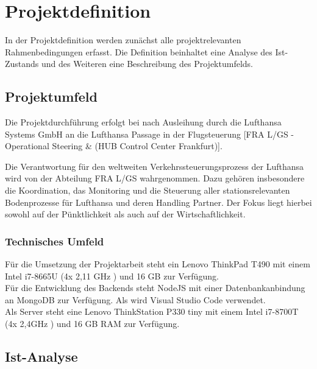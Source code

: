 \section{Projektdefinition}
	In der Projektdefinition werden zunächst alle projektrelevanten Rahmenbedingungen erfasst.
	Die Definition beinhaltet eine Analyse des Ist-Zustands und des Weiteren eine Beschreibung
	des Projektumfelds.

	\subsection{Projektumfeld}

		
		
		Die Projektdurchführung erfolgt bei nach Ausleihung durch die Lufthansa Systems GmbH an die Lufthansa Passage in der Flugsteuerung [FRA L/GS - Operational Steering \&  (HUB Control Center Frankfurt)].

		{
			\noindent
			Die Verantwortung für den weltweiten Verkehrssteuerungsprozess der Lufthansa wird von der
			Abteilung FRA L/GS wahrgenommen. Dazu gehören insbesondere die Koordination, das
			Monitoring und die Steuerung aller stationsrelevanten Bodenprozesse für Lufthansa und deren
			Handling Partner. Der Fokus liegt hierbei sowohl auf der Pünktlichkeit als auch auf der
			Wirtschaftlichkeit.
		}

		\subsubsection{Technisches Umfeld}
		
		Für die Umsetzung der Projektarbeit steht ein Lenovo ThinkPad T490 mit einem Intel i7-8665U (4x 2,11 GHz ) und 16 GB   zur Verfügung.\\
		Für die Entwicklung des Backends steht NodeJS mit einer Datenbankanbindung an MongoDB zur Verfügung. Als  wird Visual Studio Code verwendet.
		\\
		
		Als Server steht eine Lenovo ThinkStation P330 tiny mit einem Intel i7-8700T (4x 2,4GHz ) und 16 GB RAM zur Verfügung.\\
	\newpage

		\subsection{Ist-Analyse}

